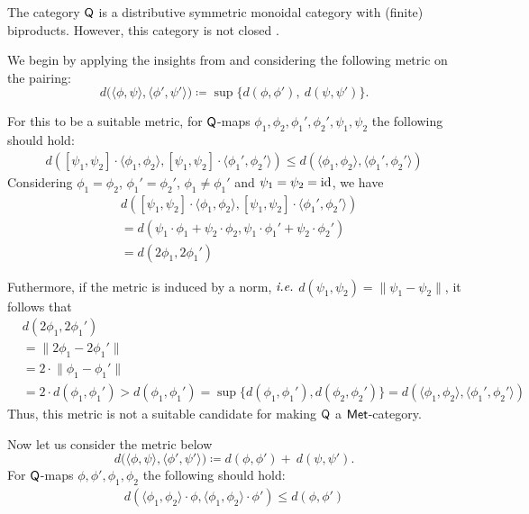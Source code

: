 The category $\mathsf{Q}$ is a distributive symmetric monoidal category with (finite) biproducts. However, this category is not closed \cite{selinger2004b}.


We begin by applying the insights from  and considering the following metric on the pairing:  
\[
d\big( \langle \phi, \psi \rangle, \langle \phi', \psi' \rangle \big) \coloneqq \sup \big\{ d(\phi, \phi'),\ d(\psi, \psi') \big\}.
\]

For this to be a suitable metric, for $\mathsf{Q}$-maps $\phi_1, \phi_2,  \phi_1', \phi_2', \psi_1, \psi_2$ the following should hold:
\begin{align*}
  d([\psi_1, \psi_2] \cdot \langle \phi_1, \phi_2 \rangle, [\psi_1, \psi_2] \cdot \langle \phi_1', \phi_2' \rangle ) \leq d(\langle \phi_1, \phi_2 \rangle, \langle \phi_1', \phi_2' \rangle )
\end{align*}
Considering $\phi_1=\phi_2$, $\phi_1'=\phi_2'$, $\phi_1 \neq \phi_1'$ and $\psi_1= \psi_2 = \mathrm{id}$, we have
\begin{align*}
  & d([\psi_1, \psi_2] \cdot \langle \phi_1, \phi_2 \rangle, [\psi_1, \psi_2] \cdot \langle \phi_1', \phi_2' \rangle ) \\
  & = d(\psi_1 \cdot \phi_1 + \psi_2 \cdot \phi_2, \psi_1 \cdot \phi_1' + \psi_2 \cdot \phi_2') \\
  & = d(2 \phi_1, 2 \phi_1')
\end{align*}

Futhermore, if the metric is induced by a norm, $\emph{i.e.}$ $d (\psi_1, \psi_2) = \lVert \psi_1 - \psi_2\lVert$, it follows that
\begin{align*}
  & d(2 \phi_1, 2 \phi_1') \\
  & = \lVert 2 \phi_1 - 2 \phi_1' \lVert \\
  & = 2 \cdot \lVert \phi_1 - \phi_1' \lVert \\
  & = 2 \cdot  d(\phi_1, \phi_1') > d(\phi_1, \phi_1') = \sup \{d(\phi_1, \phi_1'), d(\phi_2, \phi_2')\} = d(\langle \phi_1, \phi_2 \rangle, \langle \phi_1', \phi_2' \rangle )
\end{align*}
Thus, this metric is not a suitable candidate for making $\mathsf{Q}$ a $\mathsf{Met}$-category.

Now let us consider the metric below
\[
d\big( \langle \phi, \psi \rangle, \langle \phi', \psi' \rangle \big) \coloneqq  d(\phi, \phi') + \ d(\psi, \psi').
\]
For $\mathsf{Q}$-maps $ \phi, \phi', \phi_1, \phi_2$ the following should hold:
\begin{align*}
  d( \langle \phi_1, \phi_2 \rangle \cdot \phi, \langle \phi_1, \phi_2 \rangle \cdot \phi' ) \leq d(\phi, \phi')
\end{align*}

